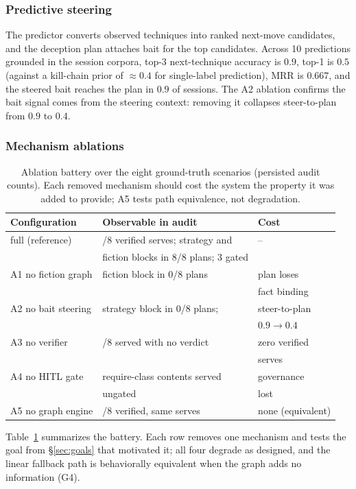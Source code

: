 \subsubsection{Predictive steering}
The \attck predictor converts observed techniques into ranked next-move
candidates, and the deception plan attaches bait for the top candidates.
Across 10 predictions grounded in the session corpora, top-3 next-technique
accuracy is $0.9$, top-1 is $0.5$ (against a kill-chain prior of
${\approx}0.4$ for single-label prediction), MRR is $0.667$, and the
steered bait reaches the plan in $0.9$ of sessions. The A2 ablation
confirms the bait signal comes from the steering context: removing it
collapses steer-to-plan from $0.9$ to $0.4$.

\subsubsection{Mechanism ablations}
\begin{table}[t]
\centering
\caption{Ablation battery over the eight ground-truth scenarios
(persisted audit counts). Each removed mechanism should cost the system
the property it was added to provide; A5 tests path equivalence, not
degradation.}
\label{tab:ablations}
\small
\setlength{\tabcolsep}{4pt}
\begin{tabular}{>{\raggedright\arraybackslash}p{2.4cm}>{\raggedright\arraybackslash}p{3.3cm}>{\raggedright\arraybackslash}p{1.9cm}}
\toprule
Configuration & Observable in audit & Cost \\
\midrule
full (reference) & 8/8 verified serves; strategy and & -- \\
 & fiction blocks in 8/8 plans; 3 gated & \\
A1 no fiction graph & fiction block in 0/8 plans & plan loses \\
 & & fact binding \\
A2 no bait steering & strategy block in 0/8 plans; & steer-to-plan \\
 & & $0.9 \to 0.4$ \\
A3 no verifier & 8/8 served with no verdict & zero verified \\
 & & serves \\
A4 no HITL gate & 3 require-class contents served & governance \\
 & ungated & lost \\
A5 no graph engine & 8/8 verified, same serves & none (equivalent) \\
\bottomrule
\end{tabular}
\end{table}
Table~\ref{tab:ablations} summarizes the battery. Each row removes one
mechanism and tests the goal from \S\ref{sec:goals} that motivated it;
all four degrade as designed, and the linear fallback
path is behaviorally equivalent when the graph adds no information (G4).

